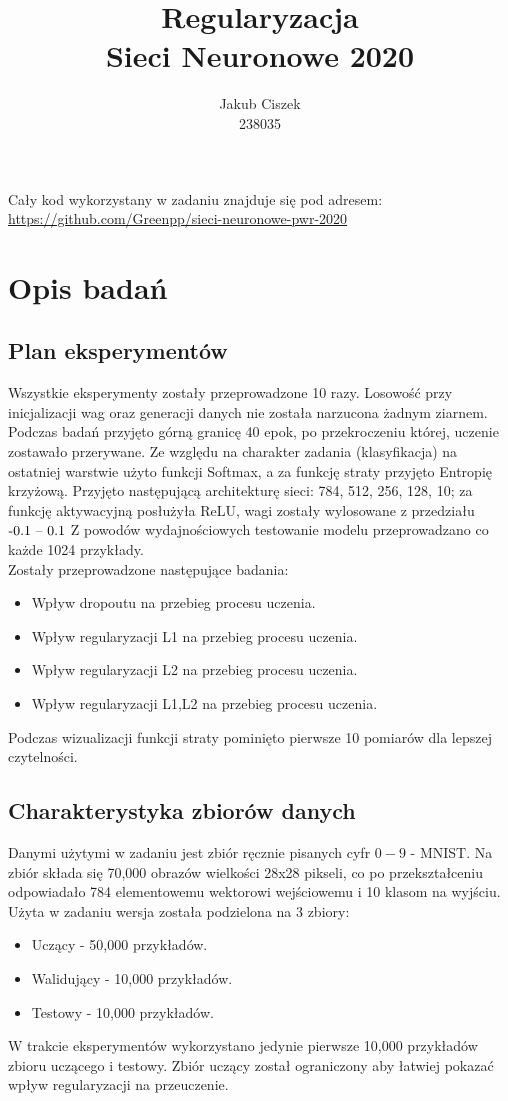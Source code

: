 \documentclass{article}
\title{  Regularyzacja\\Sieci Neuronowe 2020 }
\author{
  Jakub Ciszek \\
  238035\\
}
\begin{document}
\maketitle

\newpage
\tableofcontents
\newpage

Cały kod wykorzystany w zadaniu znajduje się pod adresem: \url{https://github.com/Greenpp/sieci-neuronowe-pwr-2020}

\section{Opis badań}
\subsection{Plan eksperymentów}

Wszystkie eksperymenty zostały przeprowadzone 10 razy. Losowość przy inicjalizacji wag oraz generacji danych nie została narzucona żadnym ziarnem. Podczas badań przyjęto górną granicę 40 epok, po przekroczeniu której, uczenie zostawało przerywane. Ze względu na charakter zadania (klasyfikacja) na ostatniej warstwie użyto funkcji Softmax, a za funkcję straty przyjęto Entropię krzyżową. Przyjęto następującą architekturę sieci: 784, 512, 256, 128, 10; za funkcję aktywacyjną posłużyła ReLU, wagi zostały wylosowane z przedziału \($-0.1 -- 0.1$\)
Z powodów wydajnościowych testowanie modelu przeprowadzano co każde 1024 przykłady.\\
Zostały przeprowadzone następujące badania:
\begin{itemize}
	\item Wpływ dropoutu na przebieg procesu uczenia.
	\item Wpływ regularyzacji L1 na przebieg procesu uczenia.
	\item Wpływ regularyzacji L2 na przebieg procesu uczenia.
	\item Wpływ regularyzacji L1,L2 na przebieg procesu uczenia.
\end{itemize}
Podczas wizualizacji funkcji straty pominięto pierwsze 10 pomiarów dla lepszej czytelności.

\subsection{Charakterystyka zbiorów danych}

Danymi użytymi w zadaniu jest zbiór ręcznie pisanych cyfr \(0-9\) - MNIST. Na zbiór składa się 70,000 obrazów wielkości 28x28 pikseli, co po przekształceniu odpowiadało 784 elementowemu wektorowi wejściowemu i 10 klasom na wyjściu. Użyta w zadaniu wersja została podzielona na 3 zbiory:
\begin{itemize}
	\item Uczący - 50,000 przykładów.
	\item Walidujący - 10,000 przykładów.
	\item Testowy - 10,000 przykładów.
\end{itemize}
W trakcie eksperymentów wykorzystano jedynie pierwsze 10,000 przykładów zbioru uczącego i testowy. Zbiór uczący został ograniczony aby łatwiej pokazać wpływ regularyzacji na przeuczenie.
\end{document}
